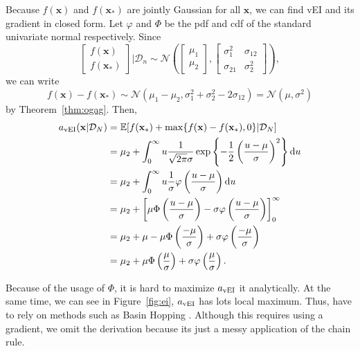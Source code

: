 Because $f(\mathbf{x})$ and $f(\mathbf{x}_*)$ are jointly Gaussian for all $\mathbf{x}$, we can find vEI and its gradient in closed form.
Let $\varphi$ and $\Phi$ be the pdf and cdf of the standard univariate normal respectively. 
Since 
\begin{equation*}
    \begin{bmatrix}
        f(\mathbf{x}) \\
        f(\mathbf{x}_*)
    \end{bmatrix}
    \bigg| \mathcal{D}_n
    \sim \mathcal{N}\left(
    \begin{bmatrix}
            \mu_1 \\
            \mu_2
        \end{bmatrix}
    ,
    \begin{bmatrix}
            \sigma_{1}^2 & \sigma_{12} \\
            \sigma_{21} & \sigma^2_2
        \end{bmatrix}
    \right),
\end{equation*}
we can write
\begin{equation*}
    f(\mathbf{x}) - f\left(\mathbf{x}_*\right) \sim \mathcal{N}(\mu_1 - \mu_2, \sigma_1^2 + \sigma_2^2 - 2\sigma_{12})
    = \mathcal{N}\left(\mu, \sigma^2\right)
\end{equation*}
by Theorem~\ref{thm:ogag}.
Then,
\begin{align*}
    a_{\mathrm{vEI}}(\mathbf{x} | \mathcal{D}_N)
    & =  \mathbb{E}[f(\mathbf{x}_*) + \max \{  f(\mathbf{x}) - f(\mathbf{x}_*), 0 \} | \mathcal{D}_N] \\
    & = \mu_2 + \int_{0}^\infty u \frac{ 1 }{ \sqrt{2 \pi } \sigma} \exp \left\{ -\frac12 \left(\frac{ u - \mu }{ \sigma }\right)^2 \right\} \mathrm{d} u \\
    & = \mu_2 + \int_{0}^\infty u \frac{ 1 }{ \sigma } \varphi\left(\frac{ u - \mu }{ \sigma }\right) \mathrm{d} u \\
    & = \mu_2 + \left[ \mu \Phi\left(\frac{ u - \mu }{ \sigma }\right) - \sigma \varphi\left(\frac{ u - \mu }{ \sigma }\right)\right]_{0}^{\infty} \\
    & = \mu_2 +  \mu - \mu \Phi\left(\frac{ -\mu }{ \sigma }\right) + \sigma \varphi\left(\frac{ -\mu }{ \sigma }\right) \\
    & = \mu_2 + \mu \Phi\left(\frac{ \mu }{ \sigma }\right) + \sigma \varphi\left(\frac{ \mu }{ \sigma }\right).
\end{align*}

Because of the usage of $\Phi$, it is hard to maximize $a_{\mathrm{vEI}}$ it analytically.
At the same time, we can see in Figure~\ref{fig:ei}, $a_{\mathrm{vEI}}$ has lots local maximum.
Thus, have to rely on methods such as Basin Hopping \cite{wales1997}.
Although this requires using a gradient, we omit the derivation because its just a messy application of the chain rule.

